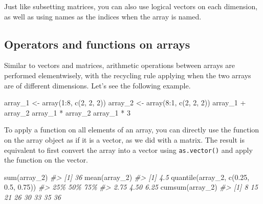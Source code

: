 \documentclass[
]{book}
\newenvironment{Shaded}{\begin{snugshade}}{\end{snugshade}}
\newcommand{\CommentTok}[1]{\textcolor[rgb]{0.56,0.35,0.01}{\textit{#1}}}
\newcommand{\DecValTok}[1]{\textcolor[rgb]{0.00,0.00,0.81}{#1}}
\newcommand{\FloatTok}[1]{\textcolor[rgb]{0.00,0.00,0.81}{#1}}
\newcommand{\FunctionTok}[1]{\textcolor[rgb]{0.00,0.00,0.00}{#1}}
\newcommand{\NormalTok}[1]{#1}
\newcommand{\OtherTok}[1]{\textcolor[rgb]{0.56,0.35,0.01}{#1}}
\newcommand{\SpecialCharTok}[1]{\textcolor[rgb]{0.00,0.00,0.00}{#1}}
\begin{document}
Just like subsetting matrices, you can also use logical vectors on each dimension, as well as using names as the indices when the array is named.

\hypertarget{operators-and-functions-on-arrays}{%
\subsection{Operators and functions on arrays}\label{operators-and-functions-on-arrays}}

Similar to vectors and matrices, arithmetic operations between arrays are performed elementwisely, with the recycling rule applying when the two arrays are of different dimensions. Let's see the following example.

\begin{Shaded}
\begin{Highlighting}[]
\NormalTok{array\_1 }\OtherTok{\textless{}{-}} \FunctionTok{array}\NormalTok{(}\DecValTok{1}\SpecialCharTok{:}\DecValTok{8}\NormalTok{, }\FunctionTok{c}\NormalTok{(}\DecValTok{2}\NormalTok{, }\DecValTok{2}\NormalTok{, }\DecValTok{2}\NormalTok{))}
\NormalTok{array\_2 }\OtherTok{\textless{}{-}} \FunctionTok{array}\NormalTok{(}\DecValTok{8}\SpecialCharTok{:}\DecValTok{1}\NormalTok{, }\FunctionTok{c}\NormalTok{(}\DecValTok{2}\NormalTok{, }\DecValTok{2}\NormalTok{, }\DecValTok{2}\NormalTok{))}
\NormalTok{array\_1 }\SpecialCharTok{+}\NormalTok{ array\_2}
\NormalTok{array\_1 }\SpecialCharTok{*}\NormalTok{ array\_2}
\NormalTok{array\_1 }\SpecialCharTok{*} \DecValTok{3}
\end{Highlighting}
\end{Shaded}

To apply a function on all elements of an array, you can directly use the function on the array object as if it is a vector, as we did with a matrix. The result is equivalent to first convert the array into a vector using \texttt{as.vector()} and apply the function on the vector.

\begin{Shaded}
\begin{Highlighting}[]
\FunctionTok{sum}\NormalTok{(array\_2)}
\CommentTok{\#\textgreater{} [1] 36}
\FunctionTok{mean}\NormalTok{(array\_2)}
\CommentTok{\#\textgreater{} [1] 4.5}
\FunctionTok{quantile}\NormalTok{(array\_2, }\FunctionTok{c}\NormalTok{(}\FloatTok{0.25}\NormalTok{, }\FloatTok{0.5}\NormalTok{, }\FloatTok{0.75}\NormalTok{))}
\CommentTok{\#\textgreater{}  25\%  50\%  75\% }
\CommentTok{\#\textgreater{} 2.75 4.50 6.25}
\FunctionTok{cumsum}\NormalTok{(array\_2)}
\CommentTok{\#\textgreater{} [1]  8 15 21 26 30 33 35 36}
\end{Highlighting}
\end{Shaded}
\end{document}

